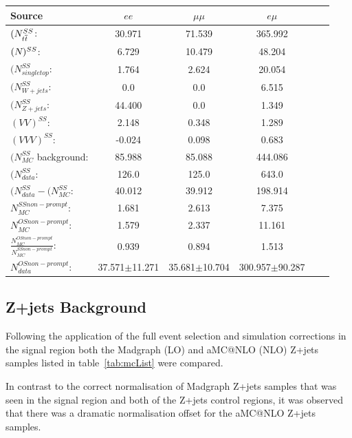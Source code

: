 \begin{table}[htbp]
\centering
\begin{tabular}{l | ccccc}
\hline
Source &  $ee$ & $\mu\mu$ & $e\mu$ \\ 
\hline
$(N_{t\overline{t}}^{SS}$: & 30.971 & 71.539 & 365.992  \\
$(N_{\tt})^{SS}$: & 6.729 & 10.479 & 48.204  \\ 
$(N_{single top}^{SS}$: & 1.764 & 2.624 & 20.054  \\
$(N_{W+jets}^{SS}$: & 0.0 & 0.0 & 6.515  \\
$(N_{Z+jets}^{SS}$: & 44.400 & 0.0 & 1.349  \\
$(VV)^{SS}$: & 2.148 & 0.348 & 1.289 \\
$(VVV)^{SS}$: & -0.024 & 0.098 & 0.683 \\
\hline
$(N_{MC}^{SS}$ background: & 85.988 & 85.088 & 444.086 \\ 
$(N_{data}^{SS}$: & 126.0 & 125.0 & 643.0  \\ 
\hline
$(N_{data}^{SS} - (N_{MC}^{SS}$: & 40.012 & 39.912 & 198.914\\
\hline
$N_{MC}^{SS non-prompt}$: & 1.681 & 2.613 & 7.375\\
$N_{MC}^{OS non-prompt}$: & 1.579 & 2.337 & 11.161\\
$\frac{N_{MC}^{OS non-prompt}}{N_{MC}^{SS non-prompt}}$: & 0.939 & 0.894 & 1.513 \\
\hline
$N_{data}^{OS non-prompt}$: & 37.571$\pm$11.271 & 35.681$\pm$10.704 & 300.957$\pm$90.287\\
\hline
\end{tabular}
\label{tab:fakeLeptonYields}
\end{table}

\subsection{Z+jets Background}\label{subsec:zPlusJetsEstimation}
Following the application of the full event selection and simulation corrections in the signal region both the Madgraph (LO) and aMC@NLO (NLO) Z+jets samples listed in table~\ref{tab:mcList} were compared.

In contrast to the correct normalisation of Madgraph Z+jets samples that was seen in the signal region and both of the Z+jets control regions, it was observed that there was a dramatic normalisation offset for the aMC@NLO Z+jets samples.

